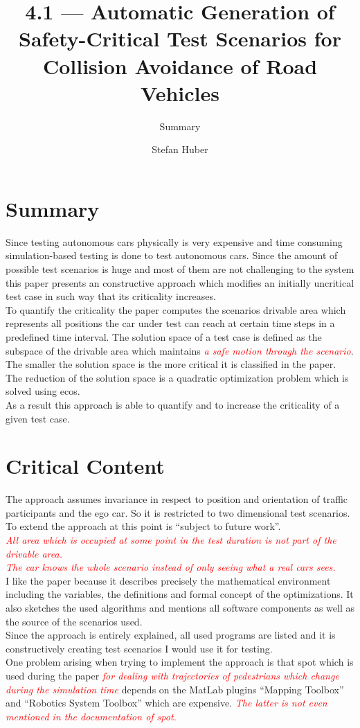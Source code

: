 \documentclass[oneside, notitlepage, twocolumn]{scrartcl}
\title{\LARGE 4.1 --- Automatic Generation of Safety-Critical Test Scenarios for Collision Avoidance of Road Vehicles}
\subtitle{Summary}
\author{Stefan Huber}
\newcommand{\draft}[1]{\textcolor{red}{\textit{#1}}}
\begin{document}
\maketitle

\section{Summary}
Since testing autonomous cars physically is very expensive and time consuming simulation-based testing is done to test autonomous cars.
Since the amount of possible test scenarios is huge and most of them are not challenging to the system this paper presents an constructive approach which modifies an initially uncritical test case in such way that its criticality increases.\\
To quantify the criticality the paper computes the scenarios drivable area which represents all positions the car under test can reach at certain time steps in a predefined time interval.
The solution space of a test case is defined as the subspace of the drivable area which maintains \draft{a safe motion through the scenario}.
The smaller the solution space is the more critical it is classified in the paper.\\
The reduction of the solution space is a quadratic optimization problem which is solved using \gls{ecos}.\\
As a result this approach is able to quantify and to increase the criticality of a given test case.

\section{Critical Content}
The approach assumes invariance in respect to position and orientation of traffic participants and the ego car.
So it is restricted to two dimensional test scenarios.
To extend the approach at this point is ``subject to future work''.\\
\draft{%
    All area which is occupied at some point in the test duration is not part of the drivable area.
}\\
\draft{The car knows the whole scenario instead of only seeing what a real cars sees.}\\
I like the paper because it describes precisely the mathematical environment including the variables, the definitions and formal concept of the optimizations.
It also sketches the used algorithms and mentions all software components as well as the source of the scenarios used.\\
Since the approach is entirely explained, all used programs are listed and it is constructively creating test scenarios I would use it for testing.\\
One problem arising when trying to implement the approach is that \gls{spot} which is used during the paper \draft{for dealing with trajectories of pedestrians which change during the simulation time} depends on the MatLab plugins ``Mapping Toolbox'' and ``Robotics System Toolbox'' which are expensive.
\draft{The latter is not even mentioned in the documentation of \gls{spot}.}
\end{document}
